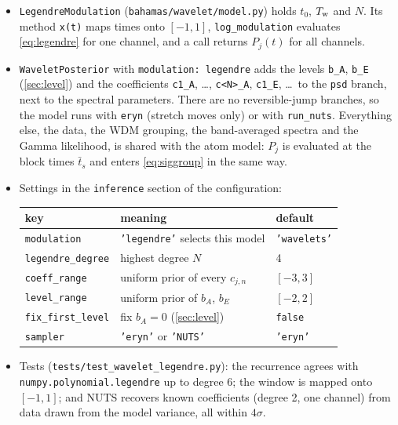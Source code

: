 \documentclass[11pt,a4paper]{article}
\begin{document}
\begin{itemize}
  \item \texttt{LegendreModulation} (\texttt{bahamas/wavelet/model.py}) holds $t_0$,
        $T_{\rm w}$ and $N$. Its method \texttt{x(t)} maps times onto $[-1,1]$,
        \texttt{log\_modulation} evaluates \cref{eq:legendre} for one channel, and a
        call returns $P_j(t)$ for all channels.
  \item \texttt{WaveletPosterior} with \texttt{modulation: legendre} adds the levels
        \texttt{b\_A}, \texttt{b\_E} (\cref{sec:level}) and the coefficients
        \texttt{c1\_A}, \dots, \texttt{c<N>\_A}, \texttt{c1\_E}, \dots\ to the
        \texttt{psd} branch, next to the spectral parameters. There are no
        reversible-jump branches, so the model runs with \texttt{eryn} (stretch moves
        only) or with \texttt{run\_nuts}. Everything else, the data, the WDM grouping,
        the band-averaged spectra and the Gamma likelihood, is shared with the atom
        model: $P_j$ is evaluated at the block times $\bar t_s$ and enters
        \cref{eq:siggroup} in the same way.
  \item Settings in the \texttt{inference} section of the configuration:
        \begin{center}
        \footnotesize
        \begin{tabular}{@{}lll@{}}
        \toprule
        key & meaning & default \\
        \midrule
        \texttt{modulation} & \texttt{'legendre'} selects this model & \texttt{'wavelets'} \\
        \texttt{legendre\_degree} & highest degree $N$ & 4 \\
        \texttt{coeff\_range} & uniform prior of every $c_{j,n}$ & $[-3,3]$ \\
        \texttt{level\_range} & uniform prior of $b_A$, $b_E$ & $[-2,2]$ \\
        \texttt{fix\_first\_level} & fix $b_A=0$ (\cref{sec:level}) & \texttt{false} \\
        \texttt{sampler} & \texttt{'eryn'} or \texttt{'NUTS'} & \texttt{'eryn'} \\
        \bottomrule
        \end{tabular}
        \end{center}
  \item Tests (\texttt{tests/test\_wavelet\_legendre.py}): the recurrence agrees with
        \texttt{numpy.polynomial.legendre} up to degree 6; the window is mapped onto
        $[-1,1]$; and NUTS recovers known coefficients (degree 2, one channel) from data
        drawn from the model variance, all within $4\sigma$.
\end{itemize}
\end{document}
